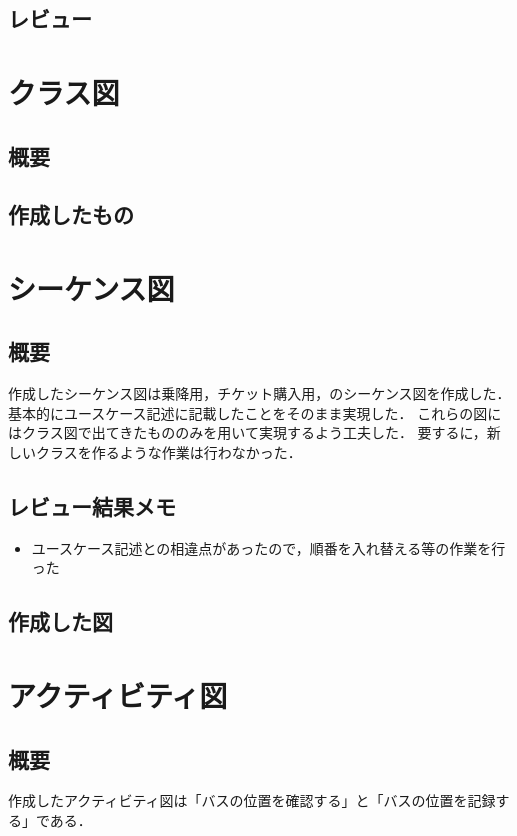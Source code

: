 \documentclass[documentclass]{jsarticle}
\begin{document}
\subsection*{レビュー}


\newpage

\section{クラス図}
\subsection*{概要}


\subsection*{作成したもの}




\newpage

\section{シーケンス図}
\subsection*{概要}
作成したシーケンス図は乗降用，チケット購入用，のシーケンス図を作成した．
基本的にユースケース記述に記載したことをそのまま実現した．
これらの図にはクラス図で出てきたもののみを用いて実現するよう工夫した．
要するに，新しいクラスを作るような作業は行わなかった．

\subsection*{レビュー結果メモ}
\begin{itemize}
  \item ユースケース記述との相違点があったので，順番を入れ替える等の作業を行った
\end{itemize}
\subsection*{作成した図}


\newpage

\section{アクティビティ図}
\subsection*{概要}
作成したアクティビティ図は「バスの位置を確認する」と「バスの位置を記録する」である．
\end{document}
